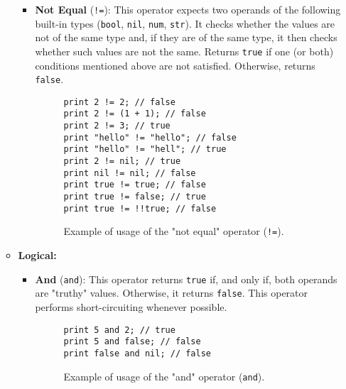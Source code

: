 \begin{itemize}
\begin{itemize}
\begin{itemize}
                    
                    \item \textbf{Not Equal} (\texttt{!=}): This operator expects two operands of the following built-in types (\texttt{bool}, \texttt{nil}, \texttt{num}, \texttt{str}). It checks whether the values are not of the same type and, if they are of the same type, it then checks whether such values are not the same. Returns \texttt{true} if one (or both) conditions mentioned above are not satisfied. Otherwise, returns \texttt{false}.
                    \begin{figure}[H]
                        \centering
                        \begin{lstlisting}
print 2 != 2; // false
print 2 != (1 + 1); // false
print 2 != 3; // true
print "hello" != "hello"; // false
print "hello" != "hell"; // true
print 2 != nil; // true
print nil != nil; // false
print true != true; // false
print true != false; // true
print true != !!true; // false
                        \end{lstlisting}
                        \caption{Example of usage of the "not equal" operator (\texttt{!=}).}
                    \end{figure}
                \end{itemize}
            \newpage
            \item \textbf{Logical:}
                \begin{itemize}
                    \item \textbf{And} (\texttt{and}): This operator returns \texttt{true} if, and only if, both operands are "truthy" values. Otherwise, it returns \texttt{false}. This operator performs short-circuiting whenever possible.
                    \begin{figure}[H]
                        \centering
                        \begin{lstlisting}
print 5 and 2; // true
print 5 and false; // false
print false and nil; // false
                        \end{lstlisting}
                        \caption{Example of usage of the "and" operator (\texttt{and}).}
                    \end{figure}
                    

\end{itemize}
\end{itemize}
\end{itemize}
